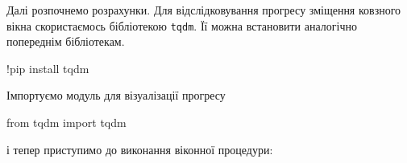 \documentclass[
  letterpaper,
]{report}
\newenvironment{Shaded}{\begin{snugshade}}{\end{snugshade}}
\newcommand{\ImportTok}[1]{\textcolor[rgb]{0.00,0.46,0.62}{#1}}
\newcommand{\NormalTok}[1]{\textcolor[rgb]{0.00,0.23,0.31}{#1}}
\newcommand{\OperatorTok}[1]{\textcolor[rgb]{0.37,0.37,0.37}{#1}}
\begin{document}
Далі розпочнемо розрахунки. Для відслідковування прогресу зміщення
ковзного вікна скористаємось бібліотекою \texttt{tqdm}. Її можна
встановити аналогічно попереднім бібліотекам.

\begin{Shaded}
\begin{Highlighting}[]
\OperatorTok{!}\NormalTok{pip install tqdm}
\end{Highlighting}
\end{Shaded}

Імпортуємо модуль для візуалізації прогресу

\begin{Shaded}
\begin{Highlighting}[]
\ImportTok{from}\NormalTok{ tqdm }\ImportTok{import}\NormalTok{ tqdm}
\end{Highlighting}
\end{Shaded}

і тепер приступимо до виконання віконної процедури:
\end{document}
